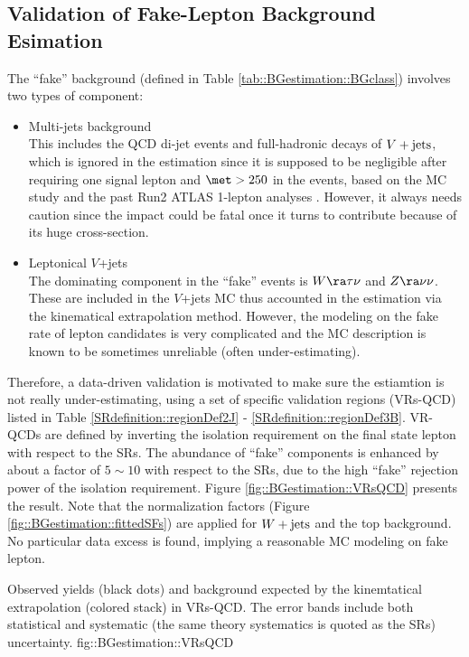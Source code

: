 \clearpage
\subsection{Validation of Fake-Lepton Background Esimation} \label{sec::BGestimation::VRQCD}
The ``fake'' background (defined in Table \ref{tab::BGestimation::BGclass}) involves two types of component:
\begin{itemize}
\item Multi-jets background \\
This includes the QCD di-jet events and full-hadronic decays of $V+\mathrm{jets}$, which is ignored in the estimation since it is supposed to be negligible after requiring one signal lepton and $\met>250$ in the events, based on the MC study and the past Run2 ATLAS 1-lepton analyses \cite{strong1L_ICHEP2016_CONF}\cite{strong1L_3p2fb_paper}.
However, it always needs caution since the impact could be fatal once it turns to contribute because of its huge cross-section. 

\item Leptonical $V$+jets \\
The dominating component in the ``fake'' events is $W\ra\tau\nu$ and $Z\ra\nu\nu$. 
These are included in the $V$+jets MC thus accounted in the estimation via the kinematical extrapolation method.
However, the modeling on the fake rate of lepton candidates is very complicated and the MC description is known to be sometimes unreliable (often under-estimating).
\end{itemize}
Therefore, a data-driven validation is motivated to make sure the estiamtion is not really under-estimating,
using a set of specific validation regions (VRs-QCD) listed in Table \ref{SRdefinition::regionDef2J} - \ref{SRdefinition::regionDef3B}.  
VR-QCDs are defined by inverting the isolation requirement on the final state lepton with respect to the SRs. 
The abundance of ``fake'' components is enhanced by about a factor of $5\sim10$ with respect to the SRs, due to the high ``fake'' rejection power of the isolation requirement. 
Figure \ref{fig::BGestimation::VRsQCD} presents the result. 
Note that the normalization factors (Figure \ref{fig::BGestimation::fittedSFs}) are applied for $W+\mathrm{jets}$ and the top background.
No particular data excess is found, implying a reasonable MC modeling on fake lepton. 

{Observed yields (black dots) and background expected by the kinemtatical extrapolation (colored stack) in VRs-QCD. 
 The error bands include both statistical and systematic (the same theory systematics is quoted as the SRs) uncertainty.
 }
{fig::BGestimation::VRsQCD}

